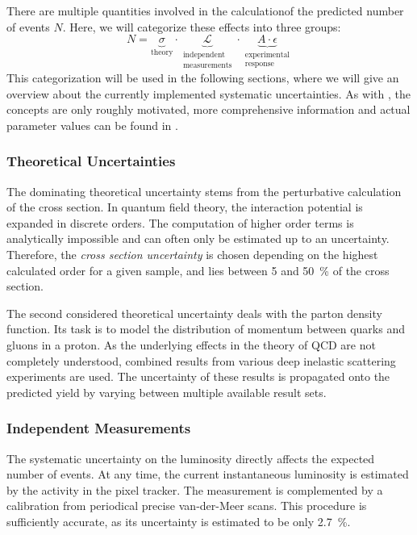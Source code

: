 There are multiple quantities involved in the calculationof the predicted number of events $N$. Here, we will categorize these effects into three groups:
\begin{equation}
N = \underbrace{\sigma}_\text{theory} \cdot \underbrace{\mathcal{L}}_{\substack{\text{independent} \\ \text{measurements}}} \cdot \underbrace{A \cdot \epsilon}_{\substack{\text{experimental} \\ \text{response}}}  
\end{equation}
This categorization will be used in the following sections, where we will give an overview about the currently implemented systematic uncertainties. As with , the concepts are only roughly motivated, more comprehensive information and actual parameter values can be found in \cite{Roemer:ModelUnspecificSearch}.

\subsubsection{Theoretical Uncertainties}
The dominating theoretical uncertainty stems from the perturbative calculation of the cross section. In quantum field theory, the interaction potential is expanded in discrete orders. The computation of higher order terms is analytically impossible and can often only be estimated up to an uncertainty. Therefore, the \emph{cross section uncertainty} is chosen depending on the highest calculated order for a given sample, and lies between \num{5} and \SI{50}{\percent} of the cross section.

The second considered theoretical uncertainty deals with the parton density function. Its task is to model the distribution of momentum between quarks and gluons in a proton. As the underlying effects in the theory of \ac{QCD} are not completely understood, combined results from various deep inelastic scattering experiments are used. The uncertainty of these results is propagated onto the predicted yield by varying between multiple available result sets.

\subsubsection{Independent Measurements}
The systematic uncertainty on the luminosity directly affects the expected number of events. 
At any time, the current instantaneous luminosity is estimated by the activity in the pixel tracker. The measurement is complemented by a calibration from periodical precise van-der-Meer scans.
This procedure is sufficiently accurate, as its uncertainty is estimated to be only \SI{2.7}{\percent}\cite{CMS:CMS-PAS-LUM-15-001}.

